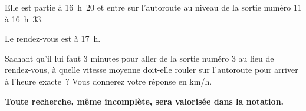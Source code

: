 \documentclass[exercice,a4]{thedocument}%
\begin{document}
\begin{center}
\end{center}
Elle est partie à 16~h~20 et entre sur l'autoroute au niveau de la sortie numéro 11 à 16~h~33. \par 
Le rendez-vous est à 17~h.\par         
Sachant qu'il lui faut 3 minutes pour aller de la sortie numéro 3 au lieu de
rendez-vous, à quelle vitesse moyenne doit-elle rouler sur l'autoroute pour
arriver à l'heure exacte~? Vous donnerez votre réponse en km/h.\par 
\textbf{Toute recherche, même incomplète, sera valorisée dans la notation.}
\showthesource
\end{document}
